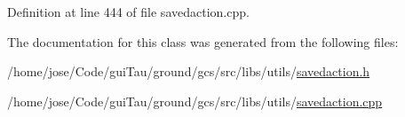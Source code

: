 Definition at line 444 of file savedaction.\-cpp.



The documentation for this class was generated from the following files\-:\begin{DoxyCompactItemize}
\item 
/home/jose/\-Code/gui\-Tau/ground/gcs/src/libs/utils/\hyperlink{savedaction_8h}{savedaction.\-h}\item 
/home/jose/\-Code/gui\-Tau/ground/gcs/src/libs/utils/\hyperlink{savedaction_8cpp}{savedaction.\-cpp}\end{DoxyCompactItemize}
